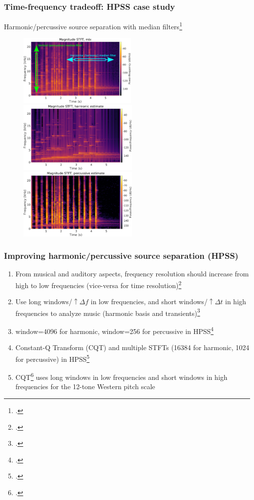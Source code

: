 \documentclass[usenames,dvipsnames]{beamer}
\begin{document}
\begin{frame}
	\frametitle{Time-frequency tradeoff: HPSS case study}
	Harmonic/percussive source separation with median filters\footcite{fitzgerald1}
	\begin{figure}
		\centering
		\includegraphics[height=3.5cm]{./images-mila-presentation/mix_stft_medianfilters.png}\\
		\includegraphics[height=3.5cm]{./images-mila-presentation/harm_stft.png}
		\includegraphics[height=3.5cm]{./images-mila-presentation/perc_stft.png}
	\end{figure}
\end{frame}

\begin{frame}
	\frametitle{Improving harmonic/percussive source separation (HPSS)}
	\begin{enumerate}
	\item
		From musical and auditory aspects, frequency resolution should increase from high to low frequencies (vice-versa for time resolution)\footcite{cqtransient}
	\item
		Use long windows/$\uparrow \Delta f$ in low frequencies, and short windows/$\uparrow \Delta t$ in high frequencies to analyze music (harmonic basis and transients)\footcite{doerflerphd}
	\item
		window=4096 for harmonic, window=256 for percussive in HPSS\footcite{driedger}
	\item
		Constant-Q Transform (CQT) and multiple STFTs (16384 for harmonic, 1024 for percussive) in HPSS\footcite{fitzgerald2}
	\item
		CQT\footcite{jbrown, klapuricqt} uses long windows in low frequencies and short windows in high frequencies for the 12-tone Western pitch scale
	\end{enumerate}
\end{frame}
\end{document}
